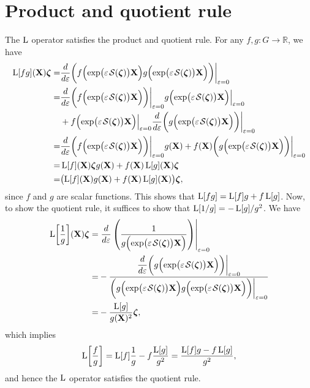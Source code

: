 \section{Product and quotient rule}
The $\operatorname{L}$ operator satisfies the product and quotient rule. For any $f,g:G\to \mathbb{R}$, we have
\begin{align}
  \begin{split}
      \Lop[fg](\mathbf{X})\boldsymbol{\zeta} =&
      \frac{d}{d\varepsilon}\biggl(f\Bigl(\exp\bigl(\varepsilon\SL[\boldsymbol{\zeta}]\bigr)\mathbf{X}\Bigr)g\Bigl(\exp\bigl(\varepsilon\SL[\boldsymbol{\zeta}]\bigr)\mathbf{X}\Bigr)\biggr)\biggr|_{\varepsilon=0}\\
      =& \frac{d}{d\varepsilon}\biggl(f\Bigl(\exp\bigl(\varepsilon\SL[\boldsymbol{\zeta}]\bigr)\mathbf{X}\Bigr)\biggr)\biggr|_{\varepsilon=0}g\Bigl(\exp\bigl(\varepsilon\SL[\boldsymbol{\zeta}]\bigr)\mathbf{X}\Bigr)\Bigr|_{\varepsilon=0}
      \\ &+ f\Bigl(\exp\bigl(\varepsilon\SL[\boldsymbol{\zeta}]\bigr)\mathbf{X}\Bigr)\Bigr|_{\varepsilon=0}\frac{d}{d\varepsilon}\biggl(g\Bigl(\exp\bigl(\varepsilon\SL[\boldsymbol{\zeta}]\bigr)\mathbf{X}\Bigr)\biggr)\biggr|_{\varepsilon=0}
      \\
      =& \frac{d}{d\varepsilon}\biggl(f\Bigl(\exp\bigl(\varepsilon\SL[\boldsymbol{\zeta}]\bigr)\mathbf{X}\Bigr)\biggr)\biggr|_{\varepsilon=0}g(\mathbf{X})
      + f(\mathbf{X})\biggl(g\Bigl(\exp\bigl(\varepsilon\SL[\boldsymbol{\zeta}]\bigr)\mathbf{X}\Bigr)\biggr)\biggr|_{\varepsilon=0}\\
      =& \Lop[f](\mathbf{X})\boldsymbol{\zeta}g(\mathbf{X}) + f(\mathbf{X})\Lop[g](\mathbf{X})\boldsymbol{\zeta}\\
        =& \bigl(\Lop[f](\mathbf{X})g(\mathbf{X}) + f(\mathbf{X})\Lop[g](\mathbf{X})\bigr)\boldsymbol{\zeta},
  \end{split}
\end{align}
since $f$ and $g$ are scalar functions. This shows that $\operatorname{L}[fg] = \operatorname{L}[f]g + f\operatorname{L}[g]$. Now, to show the quotient rule, it suffices to show that $\operatorname{L}[1/g] = -\operatorname{L}[g]/g^2$. We have
\begin{align}
    \begin{split}
        \Lop\biggl[\frac{1}{g}\biggr](\mathbf{X})\boldsymbol{\zeta} =& \left.\frac{d}{d\varepsilon}\left(\frac{1}{g\Bigl(\exp\bigl(\varepsilon\SL[\boldsymbol{\zeta}]\bigr)\mathbf{X}\Bigr)}\right)\right|_{\varepsilon=0}\\
        =& -\frac{{\displaystyle\frac{d}{d\varepsilon}}\biggl(g\Bigl(\exp\bigl(\varepsilon\SL[\boldsymbol{\zeta}]\bigr)\mathbf{X}\Bigr)\biggr)\biggr|_{\varepsilon=0}}{\biggl(g\Bigl(\exp\bigl(\varepsilon\SL[\boldsymbol{\zeta}]\bigr)\mathbf{X}\Bigr)g\Bigl(\exp\bigl(\varepsilon\SL[\boldsymbol{\zeta}]\bigr)\mathbf{X}\Bigr)\biggr)\biggr|_{\varepsilon=0}}\\
        =& -\frac{\Lop[g]}{g(\mathbf{X})^2}\boldsymbol{\zeta},
    \end{split}
\end{align}
which implies
\begin{align}
    \operatorname{L}\biggl[\frac{f}{g}\biggr] = \operatorname{L}[f]\frac{1}{g} - f\frac{\operatorname{L}[g]}{g^2} = \frac{\operatorname{L}[f]g - f\operatorname{L}[g]}{g^2},
\end{align}
and hence the $\operatorname{L}$ operator satisfies the quotient rule.
